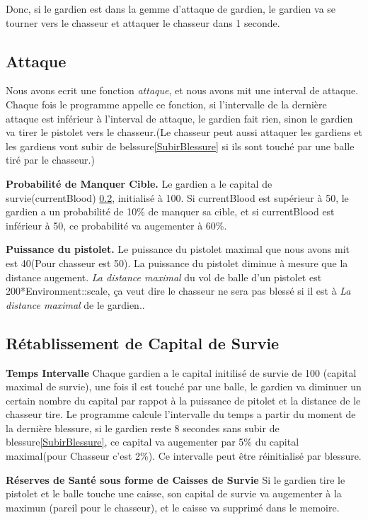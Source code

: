 \documentclass{article}
\begin{document}
Donc, si le gardien est dans la gemme d'attaque de gardien, le gardien va se tourner vers le chasseur et attaquer le chasseur dans 1 seconde.

\subsection{Attaque}
\label{attaque}
Nous avons ecrit une fonction \textsl{attaque}, et nous avons mit une interval de attaque. Chaque fois le programme appelle ce fonction, si l'intervalle de la dernière attaque est inférieur à l'interval de attaque, le gardien fait rien, sinon le gardien va tirer le pistolet vers le chasseur.(Le chasseur peut aussi attaquer les gardiens et les gardiens vont subir de belssure\ref{SubirBlessure} si ils sont touché par une balle tiré par le chasseur.)

\textbf{Probabilité de Manquer Cible.} Le gardien a le capital de survie(currentBlood) \ref{CapitalSurvie}, initialisé à 100. Si currentBlood est supérieur à 50, le gardien a un probabilité de 10\% de manquer sa cible, et si currentBlood est inférieur à 50, ce probabilité va augementer à 60\%.

\textbf{Puissance du pistolet.} Le puissance du pistolet maximal que nous avons mit est 40(Pour chasseur est 50). La puissance du pistolet diminue à mesure que la distance augement. \textsl{La distance maximal} du vol de balle d'un pistolet est 200*Environment::scale, ça veut dire le chasseur ne sera pas blessé si il est à \textsl{La distance maximal} de le gardien..

\subsection{Rétablissement de Capital de Survie}
\label{CapitalSurvie}
\textbf{Temps Intervalle} Chaque gardien a le capital initilisé de survie de 100 (capital maximal de survie), une fois il est touché par une balle, le gardien va diminuer un certain nombre du capital par rappot à la puissance de pitolet et la distance de le chasseur tire. Le programme calcule l'intervalle du temps a partir du moment de la dernière blessure, si le gardien reste 8 secondes sans subir de blessure\ref{SubirBlessure}, ce capital va augementer par 5\% du capital maximal(pour Chasseur c'est 2\%). Ce intervalle peut être réinitialisé par blessure.

\textbf{Réserves de Santé sous forme de Caisses de Survie} Si le gardien tire le pistolet et le balle touche une caisse, son capital de survie va augementer à la maximun (pareil pour le chasseur), et le caisse va supprimé dans le memoire.
\end{document}
